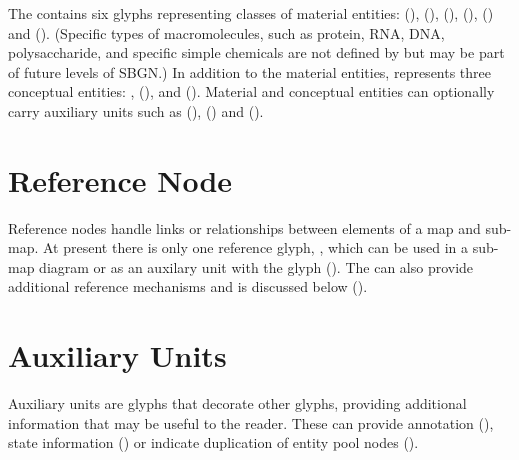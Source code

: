 The \PD contains six glyphs representing classes of material entities:  (),  (),  (),  (),  () and  ().  (Specific types of macromolecules, such as protein, RNA, DNA, polysaccharide, and specific simple chemicals are not defined by \PD but may be part of future levels of SBGN.)  In addition to the material entities, \PD represents three conceptual entities: ,  (), and  ().  Material and conceptual entities can optionally carry auxiliary units such as  (),   () and  ().











\section{Reference Node}

Reference nodes handle links or relationships between elements of a map and sub-map. At present there is only one reference glyph, , which can be used in a sub-map diagram or as an auxilary unit with the  glyph (). The  can also provide additional reference mechanisms and is discussed below ().



\section{Auxiliary Units}

Auxiliary units are glyphs that decorate other glyphs, providing additional information that may be useful to the reader. These can provide annotation (), state information () or indicate duplication of entity pool nodes ().





